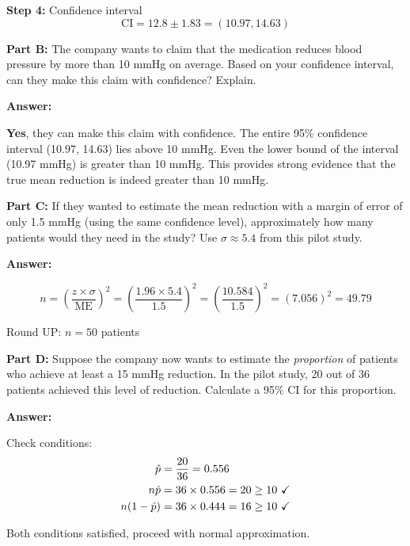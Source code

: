 \documentclass[11pt]{article}
\begin{document}
\textbf{Step 4:} Confidence interval
$$\text{CI} = 12.8 \pm 1.83 = (10.97, 14.63)$$

\vspace{6pt}

\textbf{Part B:} The company wants to claim that the medication reduces blood pressure by more than 10 mmHg on average. Based on your confidence interval, can they make this claim with confidence? Explain.

\textcolor{answergreen}{\textbf{Answer:}}

\textbf{Yes}, they can make this claim with confidence. The entire 95\% confidence interval (10.97, 14.63) lies above 10 mmHg. Even the lower bound of the interval (10.97 mmHg) is greater than 10 mmHg. This provides strong evidence that the true mean reduction is indeed greater than 10 mmHg.

\vspace{6pt}

\textbf{Part C:} If they wanted to estimate the mean reduction with a margin of error of only 1.5 mmHg (using the same confidence level), approximately how many patients would they need in the study? Use $\sigma \approx 5.4$ from this pilot study.

\textcolor{answergreen}{\textbf{Answer:}}

$$n = \left(\frac{z \times \sigma}{\text{ME}}\right)^2 = \left(\frac{1.96 \times 5.4}{1.5}\right)^2 = \left(\frac{10.584}{1.5}\right)^2 = (7.056)^2 = 49.79$$

Round UP: $n = 50$ patients

\vspace{6pt}

\textbf{Part D:} Suppose the company now wants to estimate the \textit{proportion} of patients who achieve at least a 15 mmHg reduction. In the pilot study, 20 out of 36 patients achieved this level of reduction. Calculate a 95\% CI for this proportion.

\textcolor{answergreen}{\textbf{Answer:}}

Check conditions:
\begin{align*}
\hat{p} &= \frac{20}{36} = 0.556\\
n\hat{p} &= 36 \times 0.556 = 20 \geq 10 \text{ \checkmark}\\
n(1-\hat{p}) &= 36 \times 0.444 = 16 \geq 10 \text{ \checkmark}
\end{align*}

Both conditions satisfied, proceed with normal approximation.
\end{document}
